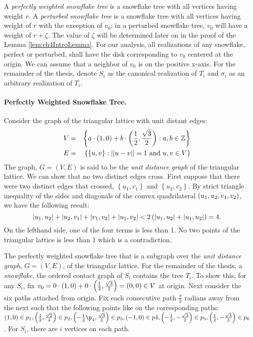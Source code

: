 A \textit{perfectly weighted snowflake tree} is a snowflake tree with all vertices having weight $r$.   
A \textit{perturbed snowflake tree} is a snowflake tree with all vertices having weight of $r$ with the exception of $v_0$;  in a perturbed snowflake tree, $v_0$ will have a weight of $r + \zeta$.  
The value of $\zeta $ will be determined later on in the proof of the Lemma \ref{lem:ch4IntroLemma}.  
For our analysis, all realizations of any snowflake, perfect or perturbed, shall have the disk corresponding to $v_0$ centered at the origin.  
We can assume that a neighbor of $v_0$ is on the positive x-axis.     
For the remainder of the thesis, denote $S_i$ as the canonical realization of $T_i$ and $\sigma_i$ as an arbitrary realization of $T_i$. 

\paragraph{Perfectly Weighted Snowflake Tree.}

Consider the graph of the triangular lattice with unit distant edges:
\begin{eqnarray*}
V &=& \left\lbrace a \cdot (1,0) + b \cdot \left(\frac{1}{2},\frac{\sqrt{3}}{2}\right) : a,b \in {\mathbb{Z}} \right\rbrace\\
E &=& \left\lbrace \left\lbrace u,v \right\rbrace : \vert\vert u-v \vert\vert = 1 \text{ and } u,v \in V\right\rbrace
\end{eqnarray*}
The graph, $G=(V,E)$ is said to be the \textit{unit distance graph} of the triangular lattice.  
We can show that no two distinct edges cross.  
First suppose that there were two distinct edges that crossed, $\left\lbrace u_1,v_1 \right\rbrace $ and $\left\lbrace u_2,v_2 \right\rbrace$. 
By strict triangle inequality of the sides and diagonals of the convex quadrilateral $\left( u_1, u_2, v_1, v_2 \right)$, we have the following result:
$$\left\vert u_1,u_2 \right\vert + \left\vert u_2,v_1 \right\vert + \left\vert v_1,v_2 \right\vert + \left\vert u_1,v_2 \right\vert < 2 \left( \left\vert u_1,u_2 \right\vert + \left\vert u_1,u_2  \right\vert \right)=4.$$ 
On the lefthand side, one of the four terms is less than 1.  
No two points of the triangular lattice is less than 1 which is a contradiction.

The perfectly weighted snowflake tree that is a subgraph over the \textit{unit distance graph}, $G=(V,E)$, of the triangular lattice.  
For the remainder of the thesis, a \textit{snowflake}, the ordered contact graph of $S_i$ contains the tree $T_i$.  
To show this, for any $S_i$, fix $v_0 = 0 \cdot (1,0) + 0 \cdot \left(\frac{1}{2},\frac{\sqrt{3}}{2}\right)=\left( 0,0 \right) \in V$ at origin.  
Next consider the six paths attached from origin.  
Fix each consecutive path $\frac{\pi}{3}$ radians away from the next such that the following points like on the corresponding paths: $\lr{1,0} \in p_1, \lr{\frac{1}{2} ,\frac{\sqrt{2}}{3}} \in p_2,\lr{-\frac{1}{2}\p_4,\frac{\sqrt{3}}{2}} \in p_3, \lr{-1,0} \in p4, \lr{-\frac{1}{2},-\frac{\sqrt{3}}{2}}\in p_5,\lr{\frac{1}{2},-\frac{\sqrt{3}}{2}}\in p_6$.  
For $S_i$, there are $i$ vertices on each path.  

